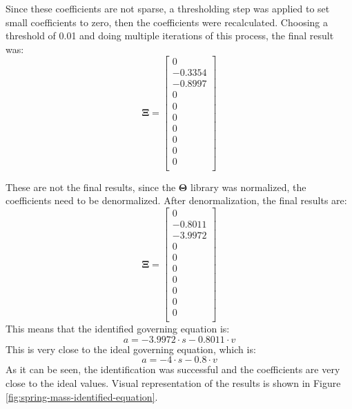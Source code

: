 ﻿\documentclass[12pt,a4paper]{article}
\begin{document}
Since these coefficients are not sparse, a thresholding step was applied to set small
coefficients to zero, then the coefficients were recalculated. Choosing a threshold of 0.01 
and doing multiple iterations of this process, the final result was:
\begin{equation}
    \bm{\Xi} = \begin{bmatrix}
    0 \\
   -0.3354 \\
   -0.8997 \\
    0 \\
    0 \\
    0 \\
    0 \\
    0 \\
    0 \\
    0 \\
    \end{bmatrix}
\end{equation}

These are not the final results, since the $\bm{\Theta}$ library was normalized,
the coefficients need to be denormalized. After denormalization, the final results are:
\begin{equation}
    \bm{\Xi} = \begin{bmatrix}
    0 \\
   -0.8011 \\
   -3.9972 \\
    0 \\
    0 \\
    0 \\
    0 \\
    0 \\
    0 \\
    0 \\
    \end{bmatrix}
\end{equation}
This means that the identified governing equation is:
\begin{equation}
    a = -3.9972 \cdot s - 0.8011 \cdot v
\end{equation}
This is very close to the ideal governing equation, which is:
\begin{equation}
    a = -4 \cdot s - 0.8 \cdot v
\end{equation}
As it can be seen, the identification was successful and the coefficients are very close to the
ideal values. Visual representation of the results is shown in Figure \ref{fig:spring-mass-identified-equation}.\par
\end{document}
